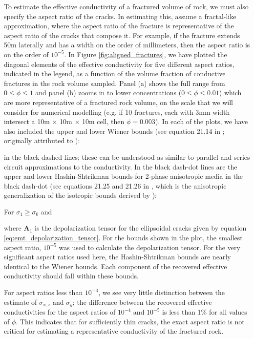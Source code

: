 To estimate the effective conductivity of a fractured volume of rock, we must also specify the aspect ratio of the cracks. In estimating this, assume a fractal-like approximation, where the aspect ratio of the fracture is representative of the aspect ratio of the cracks that compose it. For example, if the fracture extends 50m laterally and has a width on the order of millimeters, then the aspect ratio is on the order of $10^{-5}$. In Figure \ref{fig:aligned_fractures}, we have plotted the diagonal elements of the effective conductivity for five different aspect ratios, indicated in the legend, as a function of the volume fraction of conductive fractures in the rock volume sampled. Panel (a) shows the full range from $0 \leq \phi \leq 1$ and panel (b) zooms in to lower concentrations ($0 \leq \phi \leq 0.01$) which are more representative of a fractured rock volume, on the scale that we will consider for numerical modelling (e.g. if 10 fractures, each with 3mm width intersect a 10m $\times$ 10m $\times$ 10m cell, then $\phi = 0.003$). In each of the plots, we have also included the upper and lower Wiener bounds (see equation 21.14 in \cite{Torquato2002}; originally attributed to \cite{Wiener1912}):

in the black dashed lines; these can be understood as similar to parallel and series circuit approximations to the conductivity. In the black dash-dot lines are the upper and lower Hashin-Shtrikman bounds for 2-phase anisotropic media in the black dash-dot (see equations 21.25 and 21.26 in \cite{Torquato2002}, which is the anisotropic generalization of the isotropic bounds derived by \cite{Hashin1962}):

For $\sigma_1 \geq \sigma_0$ and

where $\mathbf{A}_1$ is the depolarization tensor for the ellipsoidal cracks given by equation \ref{eq:emt_depolarization_tensor}. For the bounds shown in the plot, the smallest aspect ratio, $10^{-5}$ was used to calculate the depolarization tensor. For the very significant aspect ratios used here, the Hashin-Shtrikman bounds are nearly identical to the Wiener bounds. Each component of the recovered effective conductivity should fall within these bounds.



For aspect ratios less than $10^{-3}$, we see very little distinction between the estimate of $\sigma_{x, z}$ and $\sigma_{y}$; the difference between the recovered effective conductivities for the aspect ratios of $10^{-4}$ and $10^{-5}$ is less than 1\% for all values of $\phi$. This indicates that for sufficiently thin cracks, the exact aspect ratio is not critical for estimating a representative conductivity of the fractured rock.

